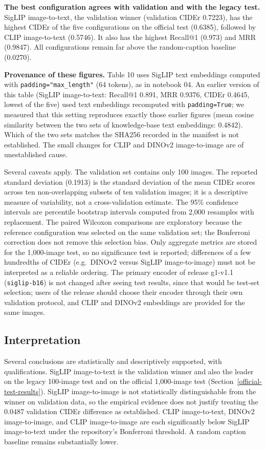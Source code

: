 \documentclass{article}
\begin{document}
\textbf{The best configuration agrees with validation and with the legacy test.}
SigLIP image-to-text, the validation winner (validation CIDEr 0.7223), has
the highest CIDEr of the five configurations on the official test (0.6385),
followed by CLIP image-to-text (0.5746). It also has the highest Recall@1
(0.973) and MRR (0.9847). All configurations remain far above the
random-caption baseline (0.0270).

\textbf{Provenance of these figures.} Table 10 uses SigLIP text embeddings
computed with \texttt{padding="max\_length"} (64 tokens), as in notebook 04.
An earlier version of this table (SigLIP image-to-text: Recall@1 0.891, MRR
0.9376, CIDEr 0.4645, lowest of the five) used text embeddings recomputed with
\texttt{padding=True}; we measured that this setting reproduces exactly those
earlier figures (mean cosine similarity between the two sets of knowledge-base
text embeddings: 0.4842). Which of the two sets matches the SHA256 recorded in
the manifest is not established. The small changes for CLIP and DINOv2
image-to-image are of unestablished cause.

Several caveats apply. The validation set contains only 100 images. The
reported standard deviation (0.1913) is the standard deviation of the
mean CIDEr scores across ten non-overlapping subsets of ten validation
images; it is a descriptive measure of variability, not a cross-validation
estimate. The 95\% confidence intervals are percentile bootstrap intervals
computed from 2,000 resamples with replacement. The paired Wilcoxon comparisons are exploratory because the reference configuration was selected on the same validation set; the Bonferroni correction does not remove this selection bias. Only aggregate metrics are
stored for the 1,000-image test, so no significance test is reported;
differences of a few hundredths of CIDEr (e.g.\ DINOv2 versus SigLIP
image-to-image) must not be interpreted as a reliable ordering.
The primary encoder of release g1-v1.1 (\texttt{siglip-b16}) is not changed
after seeing test results, since that would be test-set selection; users of the
release should choose their encoder through their own validation protocol,
and CLIP and DINOv2 embeddings are provided for the same images.

\subsection{Interpretation}\label{interpretation}

Several conclusions are statistically and descriptively supported, with
qualifications. SigLIP image-to-text is the validation winner and also the
leader on the legacy 100-image test and on the official 1,000-image test
(Section~\ref{official-test-results}). SigLIP image-to-image is not statistically distinguishable
from the winner on validation data, so the empirical evidence does not
justify treating the 0.0487 validation CIDEr difference as established.
CLIP image-to-text, DINOv2 image-to-image, and CLIP image-to-image are
each significantly below SigLIP image-to-text under the repository's
Bonferroni threshold. A random caption baseline remains substantially
lower.
\end{document}
